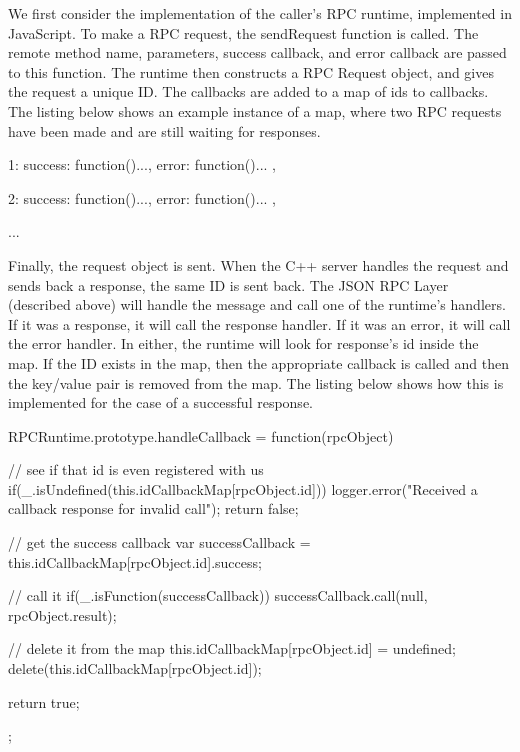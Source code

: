 We first consider the implementation of the caller's RPC runtime, implemented in JavaScript. To make a RPC request, the sendRequest function is called. The remote method name, parameters, success callback, and error callback are passed to this function. The runtime then constructs a RPC Request object, and gives the request a unique ID. The callbacks are added to a map of ids to callbacks. The listing below shows an example instance of a map, where two RPC requests have been made and are still waiting for responses.

\begin{code}
{
  1: {
    success: function(){...},
    error: function(){...}
  },  

  2: {
    success: function(){...},
    error: function(){...}
  },  

  ...
}
\end{code}


Finally, the request object is sent. When the C++ server handles the request and sends back a response, the same ID is sent back. The JSON RPC Layer (described above) will handle the message and call one of the runtime's handlers. If it was a response, it will call the response handler. If it was an error, it will call the error handler. In either, the runtime will look for response's id inside the map. If the ID exists in the map, then the appropriate callback is called and then the key/value pair is removed from the map. The listing below shows how this is implemented for the case of a successful response.

\begin{code}
  RPCRuntime.prototype.handleCallback = function(rpcObject){
    // see if that id is even registered with us
    if(_.isUndefined(this.idCallbackMap[rpcObject.id])){
      logger.error("Received a callback response for invalid call");
      return false;
    }

    // get the success callback
    var successCallback = this.idCallbackMap[rpcObject.id].success;

    // call it
    if(_.isFunction(successCallback)){
      successCallback.call(null, rpcObject.result);
    }

    // delete it from the map
    this.idCallbackMap[rpcObject.id] = undefined;
    delete(this.idCallbackMap[rpcObject.id]);

    return true;
  };
\end{code}


